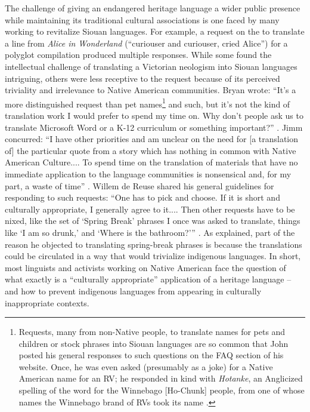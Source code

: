 \documentclass[output=paper]{LSP/langsci}
\begin{document}
The challenge of giving an endangered heritage language a wider public presence while maintaining its traditional cultural associations is one faced by many working to revitalize Siouan languages. For example, a request on the  to translate a line from \emph{Alice in Wonderland} (``curiouser and curiouser, cried Alice'') for a polyglot compilation produced multiple responses. While some found the intellectual challenge of translating a Victorian neologism into Siouan languages intriguing, others were less receptive to the request because of its perceived triviality and irrelevance to Native American communities. Bryan wrote: ``It's a more distinguished request than pet names\footnote{Requests, many from non-Native people, to translate names for pets and children or stock  phrases into Siouan languages are so common that John \citet{Koontz2003a} posted his general responses to such questions on the FAQ section of his website. Once, he was even asked (presumably as a joke) for a Native American name for an RV; he responded in kind with \emph{Hotanke}, an Anglicized spelling of the  word for the Winnebago [Ho-Chunk] people, from one of whose  names the Winnebago brand of RVs took its name \citep{Koontz2003b}.} and such, but it's not the kind of translation work I would prefer to spend my time on. Why don't people ask us to translate Microsoft Word or a K-12 curriculum or something important?'' \citep{Gordon2014}. Jimm concurred: ``I have other priorities and am unclear on the need for [a translation of] the particular quote from a story which has nothing in common with Native American Culture.... To spend time on the translation of materials that have no immediate application to the language communities is nonsensical and, for my part, a waste of time'' \citep{Goodtracks2014}. Willem de Reuse shared his general guidelines for responding to such requests: ``One has to pick and choose. If it is short and culturally appropriate, I generally agree to it.... Then other requests have to be nixed, like the set of `Spring Break' phrases I once was asked to translate, things like `I am so drunk,' and `Where is the bathroom?'\thinspace'' \citep{deReuse2014a}. As \citet{deReuse2014b} explained, part of the reason he objected to translating spring-break phrases is because the translations could be circulated in a way that would trivialize indigenous languages. In short, most linguists and activists working on Native American  face the question of what exactly is a ``culturally appropriate'' application of a heritage language -- and how to prevent indigenous languages from appearing in culturally inappropriate contexts.
\end{document}
